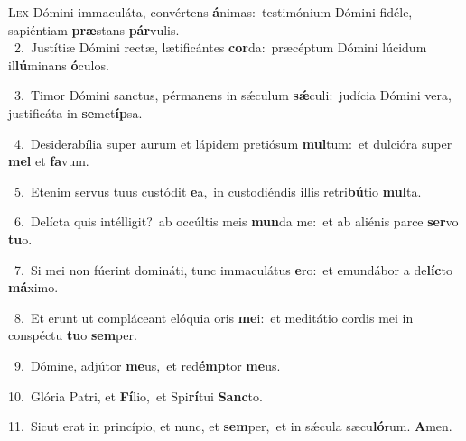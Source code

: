 \lettrine{\initial\textcolor{\initialcolor}{L}}{ex} Dómini immaculáta, convértens \textbf{á}\-nimas:~\star testimónium Dómini fidéle, sapiéntiam \textbf{præ}\-stans \textbf{pár}\-vulis.\\
{\numbfont\textcolor{\numbcolor}{~2.}}~Justítiæ Dómini rectæ, lætificántes \textbf{cor}\-da:~\star præcéptum Dómini lúcidum il\-\textbf{lú}\-minans \textbf{ó}\-culos.\par
{\numbfont\textcolor{\numbcolor}{~3.}}~Timor Dómini sanctus, pérmanens in sǽculum \textbf{sǽ}\-culi:~\star judícia Dómini vera, justificáta in \textbf{se}\-met\-\textbf{íp}\-sa.\par
{\numbfont\textcolor{\numbcolor}{~4.}}~Desiderabília super aurum et lápidem pretiósum \textbf{mul}\-tum:~\star et dulcióra super \textbf{mel} et \textbf{fa}\-vum.\par
{\numbfont\textcolor{\numbcolor}{~5.}}~Etenim servus tuus custódit \textbf{e}\-a,~\star in custodiéndis illis retri\-\textbf{bú}\-tio \textbf{mul}\-ta.\par
{\numbfont\textcolor{\numbcolor}{~6.}}~Delícta quis intélligit?~\dagger ab occúltis meis \textbf{mun}\-da me:~\star et ab aliénis parce \textbf{ser}\-vo \textbf{tu}\-o.\par
{\numbfont\textcolor{\numbcolor}{~7.}}~Si mei non fúerint domináti, tunc immaculátus \textbf{e}\-ro:~\star et emundábor a de\-\textbf{líc}\-to \textbf{má}\-ximo.\par
{\numbfont\textcolor{\numbcolor}{~8.}}~Et erunt ut compláceant elóquia oris \textbf{me}\-i:~\star et meditátio cordis mei in conspéctu \textbf{tu}\-o \textbf{sem}\-per.\par
{\numbfont\textcolor{\numbcolor}{~9.}}~Dómine, adjútor \textbf{me}\-us,~\star et red\-\textbf{émp}\-tor \textbf{me}\-us.\par
{\numbfont\textcolor{\numbcolor}{10.}}~Glória Patri, et \textbf{Fí}\-lio,~\star et Spi\-\textbf{rí}\-tui \textbf{Sanc}\-to.\par
{\numbfont\textcolor{\numbcolor}{11.}}~Sicut erat in princípio, et nunc, et \textbf{sem}\-per,~\star et in sǽcula sæcu\-\textbf{ló}\-rum. \textbf{A}\-men.\par
